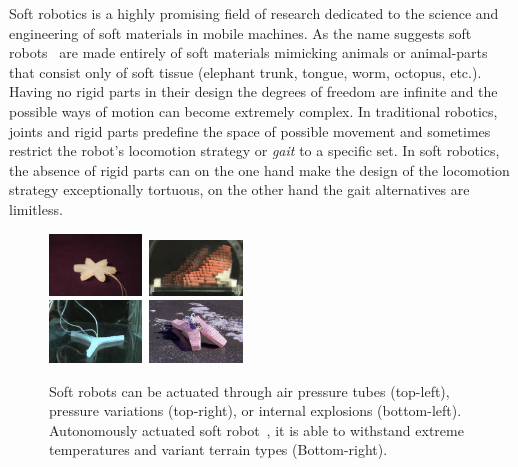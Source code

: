 \documentclass{sig-alternate}
\begin{document}
Soft robotics is a highly promising field of research dedicated to the science and engineering of soft materials in mobile machines. As the name suggests soft robots~\cite{trivedi2008soft, pfeifer2012challenges} are made entirely of soft materials mimicking animals or animal-parts that consist only of soft tissue (elephant trunk, tongue, worm, octopus, etc.). Having no rigid parts in their design the degrees of freedom are infinite and the possible ways of motion can become extremely complex. In traditional robotics, joints and rigid parts predefine the space of possible movement and sometimes restrict the robot's locomotion strategy or \emph{gait} to a specific set. In soft robotics, the absence of rigid parts can on the one hand make the design of the locomotion strategy exceptionally tortuous, on the other hand the gait alternatives are limitless.

\begin{figure}[t!]
\centering
\includegraphics[width=0.22\textwidth,height=0.12\textheight]{../Figures/Misc/soft_robotics_figure.png}\		
\includegraphics[width=0.22\textwidth,height=0.12\textheight]{../Figures/Misc/hillerPressureChamber.png}\\[0.1cm]	
\includegraphics[width=0.22\textwidth,height=0.12\textheight]{../Figures/Misc/ExplodingRobot.jpg}\	
\includegraphics[width=0.22\textwidth,height=0.12\textheight]{../Figures/Misc/softbot.jpg}\\
\caption{Soft robots can be actuated through air pressure tubes (top-left), pressure variations (top-right), or internal explosions (bottom-left). Autonomously actuated soft robot~\cite{tolleyresilient}, it is able to withstand extreme temperatures and variant terrain types (Bottom-right).}
\label{fig:softRobotsActuation}
\end{figure}
\end{document}
